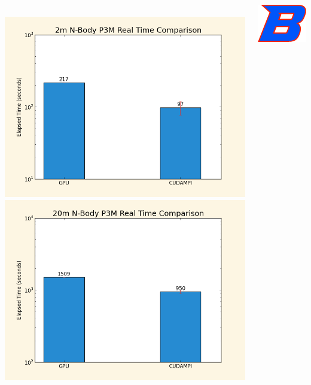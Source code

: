 \documentclass[17pt,hyperref={pdfpagelabels=false}]{beamer}
\newlength{\onecolumnwidth}
\begin{document}
\begin{frame}[t]
\begin{columns}[t,onlytextwidth=\textwidth]
\begin{column}{0.99\paperwidth}
\begin{columns}[t,onlytextwidth=\textwidth]
\begin{column}[t,onlytextwidth=\textwidth]{\onecolumnwidth}
            \hfill{}\\{}
            \includegraphics[scale=0.9]{2m_bar_chart.png}
            \includegraphics[scale=0.9]{20m_bar_chart.png}
        \end{column}
        \begin{column}[t,onlytextwidth=\textwidth]{\onecolumnwidth}
            
            
            
            \vspace{1cm}
            \includegraphics[scale=0.8]{bsulogo.png}\hspace{1cm}

\end{column}
\end{columns}
\end{column}
\end{columns}
\end{frame}
\end{document}
